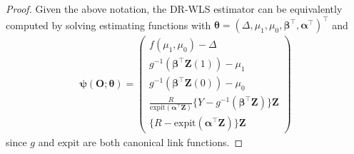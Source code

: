 \documentclass[12pt]{article}
\newcommand{\bO}{\boldsymbol{O}}
\newcommand{\bZ}{\boldsymbol{Z}}
\newcommand{\balpha}{\boldsymbol{\alpha}}
\newcommand{\bbeta}{\boldsymbol{\beta}}
\newcommand{\btheta}{\boldsymbol{\theta}}
\newcommand{\bpsi}{\boldsymbol{\psi}}
\begin{document}
\begin{proof}
    Given the above notation, the DR-WLS estimator can be equivalently computed by solving estimating functions with $\btheta = (\Delta, \mu_1, \mu_0, \bbeta^\top, \balpha^\top)^\top$ and
    \begin{align*}
        \bpsi(\bO;\btheta) = \left(\begin{array}{c}
            f(\mu_1,\mu_0) - \Delta \\
            g^{-1}(\bbeta^\top \bZ(1)) - \mu_1 \\
            g^{-1}(\bbeta^\top \bZ(0)) - \mu_0 \\
            \frac{R}{\text{expit}(\balpha^\top \bZ)}\{Y - g^{-1}(\bbeta^\top \bZ)\} \bZ \\
            \{R-\text{expit}(\balpha^\top \bZ)\} \bZ
        \end{array}\right)
    \end{align*}
    since $g$ and $\text{expit}$ are both canonical link functions.


\end{proof}
\end{document}
